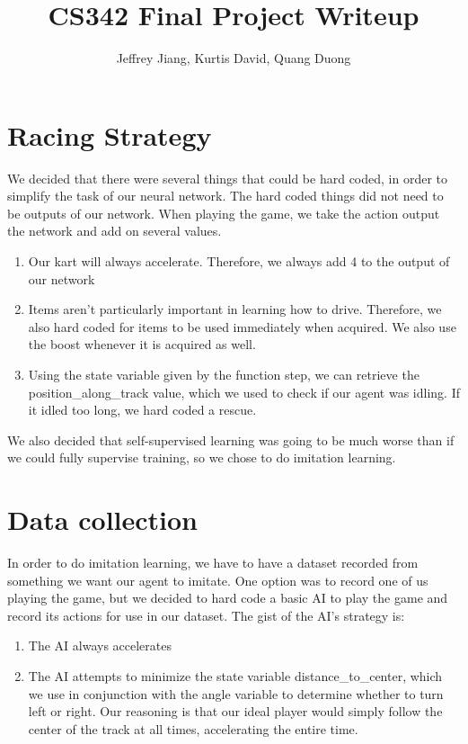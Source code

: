 \documentclass[psamsfonts]{amsart}
\theoremstyle{definition}
\theoremstyle{remark}
\begin{document}
\author{Jeffrey Jiang, Kurtis David, Quang Duong}
\title{CS342 Final Project Writeup}
\maketitle

\section*{Racing Strategy}

We decided that there were several things that could be hard coded, in order to simplify the task of our neural network. The hard coded things did not need to be outputs of our network. When playing the game, we take the action output the network and add on several values.
\begin{enumerate}
\item Our kart will always accelerate. Therefore, we always add 4 to the output of our network
\item Items aren't particularly important in learning how to drive. Therefore, we also hard coded for items to be used immediately when acquired. We also use the boost whenever it is acquired as well.
\item Using the state variable given by the function step, we can retrieve the position\_along\_track value, which we used to check if our agent was idling. If it idled too long, we hard coded a rescue.
\end{enumerate}

We also decided that self-supervised learning was going to be much worse than if we could fully supervise training, so we chose to do imitation learning.


\section*{Data collection}

In order to do imitation learning, we have to have a dataset recorded from something we want our agent to imitate. One option was to record one of us playing the game, but we decided to hard code a basic AI to play the game and record its actions for use in our dataset. The gist of the AI's strategy is:
\begin{enumerate}
\item The AI always accelerates
\item The AI attempts to minimize the state variable distance\_to\_center, which we use in conjunction with the angle variable to determine whether to turn left or right. Our reasoning is that our ideal player would simply follow the center of the track at all times, accelerating the entire time.
\end{enumerate}
\end{document}
